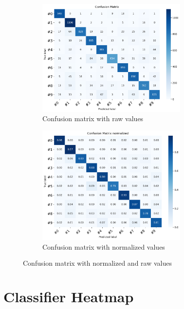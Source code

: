 \documentclass[a4paper]{article}    %
\begin{document}
\begin{figure}[H]
    \centering
    \begin{subfigure}{0.48\textwidth}
        \centering
        \includegraphics[width=7.5cm]{cm_raw}
        \caption{Confusion matrix with raw values}
        \label{fig:cm_raw}
    \end{subfigure}
    \hfill
    \begin{subfigure}{0.48\textwidth}
        \centering
        \includegraphics[width=7.5cm]{cm_norm}
        \caption{Confusion matrix with normalized values}
        \label{fig:cm_norm}
    \end{subfigure}
    \hfill
    \caption{Confusion matrix with normalized and raw values} 
    \label{fig:cm}
\end{figure}

\section{Classifier Heatmap}
\end{document}
